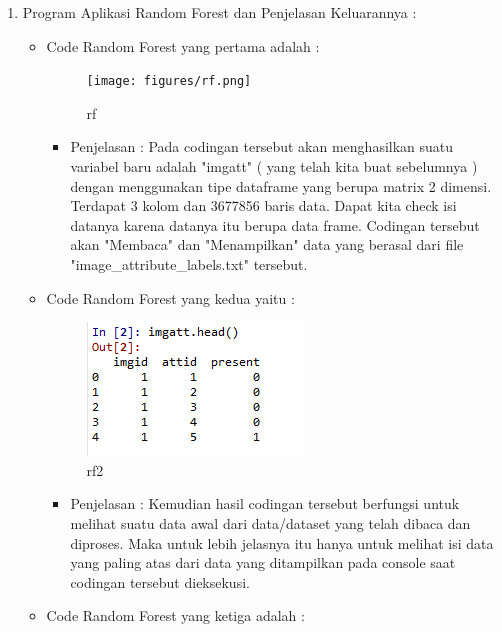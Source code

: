 \begin{enumerate}
\par
\par
\item Program Aplikasi Random Forest dan Penjelasan Keluarannya :
\begin{itemize}
\item Code Random Forest yang pertama adalah :
\par
\begin{figure}[ht]
\centering
\texttt{[image: figures/rf.png]}
\caption{rf }
\label{contoh}
\end{figure}
\par
\begin{itemize}
\item Penjelasan : Pada codingan tersebut akan menghasilkan suatu variabel baru adalah "imgatt" ( yang telah kita buat sebelumnya ) dengan menggunakan tipe dataframe yang berupa matrix 2 dimensi. Terdapat 3 kolom dan 3677856 baris data. Dapat kita check isi datanya karena datanya itu berupa data frame. Codingan tersebut akan  "Membaca" dan "Menampilkan" data yang berasal dari file "image\_attribute\_labels.txt" tersebut.
\par 
\par
\end{itemize}
\item Code Random Forest yang kedua yaitu :
\par
\begin{figure}[ht]
\centering
\includegraphics[scale=0.4]{figures/rf2.png}
\caption{rf2}
\label{contoh}
\end{figure}
\par
\begin{itemize}
\item Penjelasan : Kemudian hasil codingan tersebut berfungsi untuk melihat suatu data awal dari data/dataset yang telah dibaca dan diproses. Maka untuk lebih jelasnya itu hanya untuk melihat isi data yang paling atas dari data yang ditampilkan pada console saat codingan tersebut dieksekusi.
\par
\par
\end{itemize}
\item Code Random Forest yang ketiga adalah :

\end{itemize}
\end{enumerate}
